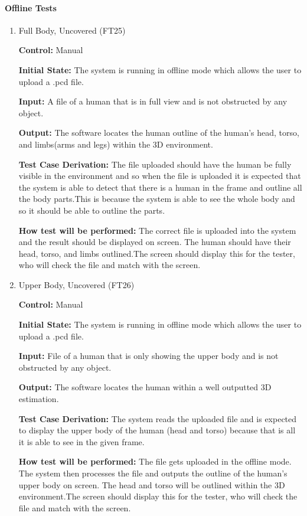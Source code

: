 \documentclass[12pt, titlepage]{article}
\begin{document}
\paragraph{Offline Tests}
\begin{enumerate}
  \item{Full Body, Uncovered (FT25)\\}
  
  \textbf{Control:} Manual

  \textbf{Initial State:} The system is running in offline mode which allows the user to upload a .pcd file.
  
  \textbf{Input:}  A  file of a human that is in full view and is not obstructed by any object. 

  \textbf{Output:} The software locates the human outline of the human’s head, torso, and limbs(arms and legs) within the 3D environment. 
  
  \textbf{Test Case Derivation:} The file uploaded should have the human be fully visible in the environment and so when the file is uploaded it is expected that the system is able to detect that there is a human in the frame and outline all the  body parts.This is because the system is able to see the whole body and so it should be able to outline the parts.
  
  \textbf{How test will be performed:} The correct file is uploaded into the system and the result should be displayed on screen. The human should have their head, torso, and limbs outlined.The screen should display this for the tester, who will check the file and match with the screen.
  
  \item{Upper Body, Uncovered (FT26)\\}

  \textbf{Control:} Manual

  \textbf{Initial State:} The system is running in offline mode which allows the user to upload a .pcd file.

  \textbf{Input:} File of a human that is only showing the upper body and is not obstructed by any object.

  \textbf{Output:} The software locates the human within a well outputted 3D estimation.

  \textbf{Test Case Derivation:} The system reads the uploaded file and is expected to display the upper body of the human (head and torso) because that is all it is able to see in the given frame.

  \textbf{How test will be performed:} The file gets uploaded in the offline mode. The system then processes the file and outputs the outline of the human's upper body on screen. The head and torso will be outlined within the 3D environment.The screen should display this for the tester, who will check the file and match with the screen.
  

\end{enumerate}
\end{document}
